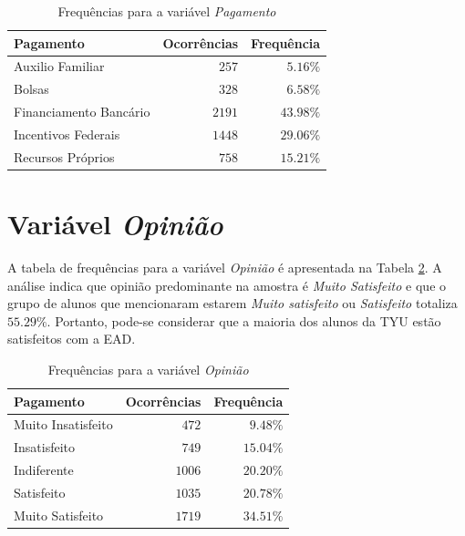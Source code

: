 \documentclass[10pt,a4paper,oneside]{article}
\begin{document}
\begin{table}[h]
\small
\centering
\caption{Frequências para a variável \textit{Pagamento}}
\label{table: frequencias pagamento}
\vspace{0.5em}
\begin{tabular}{l r r}
	\toprule
	\textbf{Pagamento}     & \textbf{Ocorrências} & \textbf{Frequência} \\
	\midrule
	Auxilio Familiar       & $257$                & $5.16\%$            \\
	Bolsas                 & $328$                & $6.58\%$            \\
	Financiamento Bancário & $2191$               & $43.98\%$           \\
	Incentivos Federais    & $1448$               & $29.06\%$           \\
	Recursos Próprios      & $758$                & $15.21\%$           \\
	\bottomrule
\end{tabular}
\end{table}

\section{Variável \textit{Opinião}}
\label{section:opiniao}

A tabela de frequências para a variável \textit{Opinião} é apresentada na Tabela \ref{table: frequencias opiniao}. A análise indica que opinião predominante na amostra é \textit{Muito Satisfeito} e que o grupo de alunos que mencionaram estarem \textit{Muito satisfeito} ou \textit{Satisfeito} totaliza $55.29\%$. Portanto, pode-se considerar que a maioria dos alunos da TYU estão satisfeitos com a EAD.

\begin{table}[h]
\small
\centering
\caption{Frequências para a variável \textit{Opinião}}
\label{table: frequencias opiniao}
\vspace{0.5em}
\begin{tabular}{l r r}
	\toprule
	\textbf{Pagamento}     & \textbf{Ocorrências} & \textbf{Frequência} \\
	\midrule
	Muito Insatisfeito     & $472$                & $9.48\%$            \\
	Insatisfeito           & $749$                & $15.04\%$           \\
	Indiferente            & $1006$               & $20.20\%$           \\
	Satisfeito             & $1035$               & $20.78\%$           \\
	Muito Satisfeito       & $1719$               & $34.51\%$           \\
	\bottomrule
\end{tabular}
\end{table}
\end{document}
